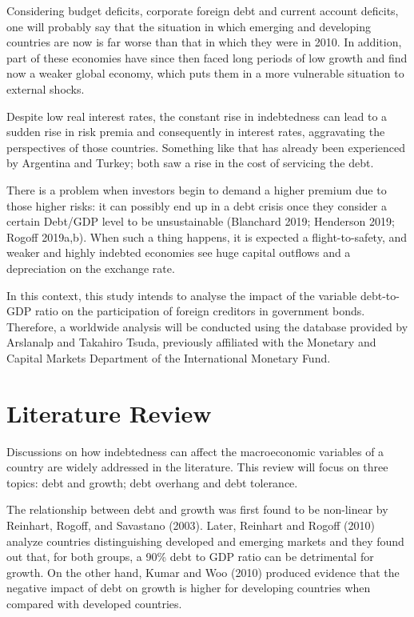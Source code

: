 \documentclass[]{article}
\begin{document}
Considering budget deficits, corporate foreign debt and current account
deficits, one will probably say that the situation in which emerging and
developing countries are now is far worse than that in which they were
in 2010. In addition, part of these economies have since then faced long
periods of low growth and find now a weaker global economy, which puts
them in a more vulnerable situation to external shocks.

Despite low real interest rates, the constant rise in indebtedness can
lead to a sudden rise in risk premia and consequently in interest rates,
aggravating the perspectives of those countries. Something like that has
already been experienced by Argentina and Turkey; both saw a rise in the
cost of servicing the debt.

There is a problem when investors begin to demand a higher premium due
to those higher risks: it can possibly end up in a debt crisis once they
consider a certain Debt/GDP level to be unsustainable (Blanchard 2019;
Henderson 2019; Rogoff 2019a,b). When such a thing happens, it is
expected a flight-to-safety, and weaker and highly indebted economies
see huge capital outflows and a depreciation on the exchange rate.

In this context, this study intends to analyse the impact of the
variable debt-to-GDP ratio on the participation of foreign creditors in
government bonds. Therefore, a worldwide analysis will be conducted
using the database provided by Arslanalp and Takahiro Tsuda, previously
affiliated with the Monetary and Capital Markets Department of the
International Monetary Fund.

\section{Literature Review}\label{literature-review}

Discussions on how indebtedness can affect the macroeconomic variables
of a country are widely addressed in the literature. This review will
focus on three topics: debt and growth; debt overhang and debt
tolerance.

The relationship between debt and growth was first found to be
non-linear by Reinhart, Rogoff, and Savastano (2003). Later, Reinhart
and Rogoff (2010) analyze countries distinguishing developed and
emerging markets and they found out that, for both groups, a 90\% debt
to GDP ratio can be detrimental for growth. On the other hand, Kumar and
Woo (2010) produced evidence that the negative impact of debt on growth
is higher for developing countries when compared with developed
countries.
\end{document}
